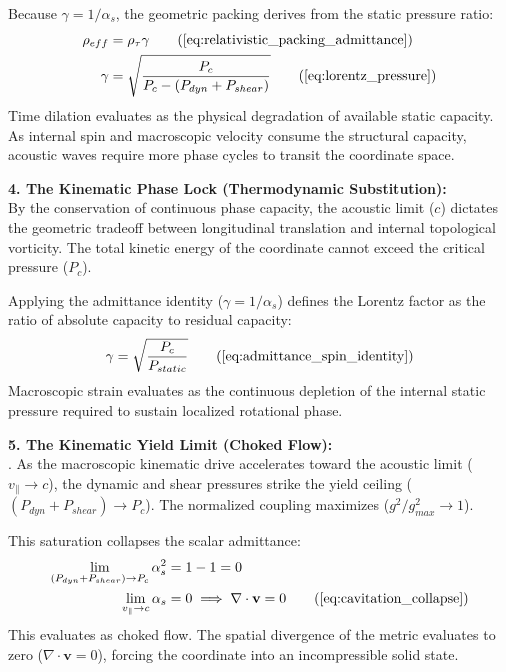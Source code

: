 Because $\gamma = 1/\alpha_s$, the geometric packing derives from the static pressure ratio:
\begin{align}
    \rho_{eff} &= \rho_{\tau} \gamma \tag{\ref{eq:relativistic_packing_admittance}} \\
    \gamma &= \sqrt{\frac{P_c}{P_c - (P_{dyn} + P_{shear})}} \tag{\ref{eq:lorentz_pressure}}
\end{align}
Time dilation evaluates as the physical degradation of available static capacity. As internal spin and macroscopic velocity consume the structural capacity, acoustic waves require more phase cycles to transit the coordinate space.

\textbf{4. The Kinematic Phase Lock (Thermodynamic Substitution):} \\
By the conservation of continuous phase capacity, the acoustic limit ($c$) dictates the geometric tradeoff between longitudinal translation and internal topological vorticity. The total kinetic energy of the coordinate cannot exceed the critical pressure ($P_c$).

Applying the admittance identity ($\gamma = 1/\alpha_s$) defines the Lorentz factor as the ratio of absolute capacity to residual capacity: 
\begin{equation}
    \gamma = \sqrt{\frac{P_c}{P_{static}}} \tag{\ref{eq:admittance_spin_identity}}
\end{equation}
Macroscopic strain evaluates as the continuous depletion of the internal static pressure required to sustain localized rotational phase.

\textbf{5. The Kinematic Yield Limit (Choked Flow):} \\ .
As the macroscopic kinematic drive accelerates toward the acoustic limit ($v_{\parallel} \to c$), the dynamic and shear pressures strike the yield ceiling ($(P_{dyn} + P_{shear}) \to P_c$). The normalized coupling maximizes ($g^2/g_{max}^2 \to 1$).

This saturation collapses the scalar admittance: 
\begin{align}
    \lim_{(P_{dyn} + P_{shear}) \to P_c} \alpha_s^2 &= 1 - 1 = 0 \\
    \lim_{v_{\parallel} \to c} \alpha_s &= 0 \implies \nabla \cdot \mathbf{v} = 0 \tag{\ref{eq:cavitation_collapse}}
\end{align}
This evaluates as choked flow. The spatial divergence of the metric evaluates to zero ($\nabla \cdot \mathbf{v} = 0$), forcing the coordinate into an incompressible solid state.

